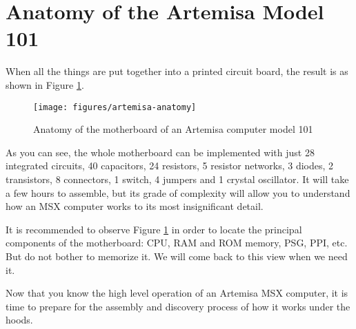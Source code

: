 \section{Anatomy of the Artemisa Model 101}

When all the things are put together into a printed circuit board, the result is as shown in Figure \ref{fig:artemisa-anatomy}.

\begin{figure}[h]
  \centering
  \texttt{[image: figures/artemisa-anatomy]}
  \caption{Anatomy of the motherboard of an Artemisa computer model 101}
  \label{fig:artemisa-anatomy}
\end{figure}

As you can see, the whole motherboard can be implemented with just 28 integrated circuits, 40 capacitors, 24 resistors, 5 resistor networks, 3 diodes, 2 transistors, 8 connectors, 1 switch, 4 jumpers and 1 crystal oscillator. It will take a few hours to assemble, but its grade of complexity will allow you to understand how an MSX computer works to its most insignificant detail.

It is recommended to observe Figure \ref{fig:artemisa-anatomy} in order to locate the principal components of the motherboard: CPU, RAM and ROM memory, PSG, PPI, etc. But do not bother to memorize it. We will come back to this view when we need it.

Now that you know the high level operation of an Artemisa MSX computer, it is time to prepare for the assembly and discovery process of how it works under the hoods.
